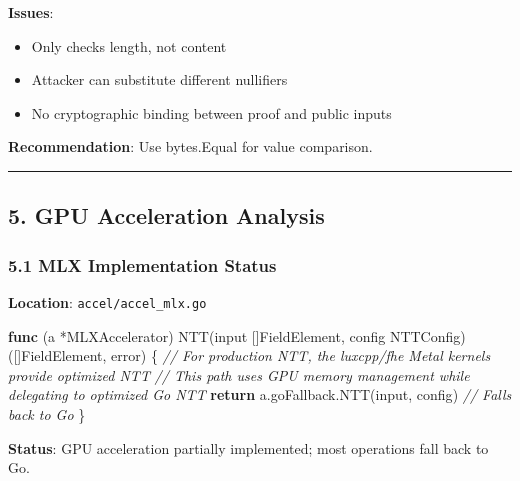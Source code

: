 \documentclass[
]{article}
\newenvironment{Shaded}{}{}
\newcommand{\CommentTok}[1]{\textcolor[rgb]{0.38,0.63,0.69}{\textit{#1}}}
\newcommand{\ControlFlowTok}[1]{\textcolor[rgb]{0.00,0.44,0.13}{\textbf{#1}}}
\newcommand{\DataTypeTok}[1]{\textcolor[rgb]{0.56,0.13,0.00}{#1}}
\newcommand{\KeywordTok}[1]{\textcolor[rgb]{0.00,0.44,0.13}{\textbf{#1}}}
\newcommand{\NormalTok}[1]{#1}
\newcommand{\OperatorTok}[1]{\textcolor[rgb]{0.40,0.40,0.40}{#1}}
\providecommand{\tightlist}{%
  \setlength{\itemsep}{0pt}\setlength{\parskip}{0pt}}
\begin{document}
\textbf{Issues}:

\begin{itemize}
\tightlist
\item
  Only checks length, not content
\item
  Attacker can substitute different nullifiers
\item
  No cryptographic binding between proof and public inputs
\end{itemize}

\textbf{Recommendation}: Use bytes.Equal for value comparison.

\begin{center}\rule{0.5\linewidth}{0.5pt}\end{center}

\subsection{5. GPU Acceleration
Analysis}\label{5-gpu-acceleration-analysis}

\subsubsection{5.1 MLX Implementation
Status}\label{51-mlx-implementation-status}

\textbf{Location}: \texttt{accel/accel\_mlx.go}

\begin{Shaded}
\begin{Highlighting}[]
\KeywordTok{func} \OperatorTok{(}\NormalTok{a }\OperatorTok{*}\NormalTok{MLXAccelerator}\OperatorTok{)}\NormalTok{ NTT}\OperatorTok{(}\NormalTok{input }\OperatorTok{[]}\NormalTok{FieldElement}\OperatorTok{,}\NormalTok{ config NTTConfig}\OperatorTok{)} \OperatorTok{([]}\NormalTok{FieldElement}\OperatorTok{,} \DataTypeTok{error}\OperatorTok{)} \OperatorTok{\{}
    \CommentTok{// For production NTT, the luxcpp/fhe Metal kernels provide optimized NTT}
    \CommentTok{// This path uses GPU memory management while delegating to optimized Go NTT}
    \ControlFlowTok{return}\NormalTok{ a}\OperatorTok{.}\NormalTok{goFallback}\OperatorTok{.}\NormalTok{NTT}\OperatorTok{(}\NormalTok{input}\OperatorTok{,}\NormalTok{ config}\OperatorTok{)}  \CommentTok{// Falls back to Go}
\OperatorTok{\}}
\end{Highlighting}
\end{Shaded}

\textbf{Status}: GPU acceleration partially implemented; most operations
fall back to Go.
\end{document}
